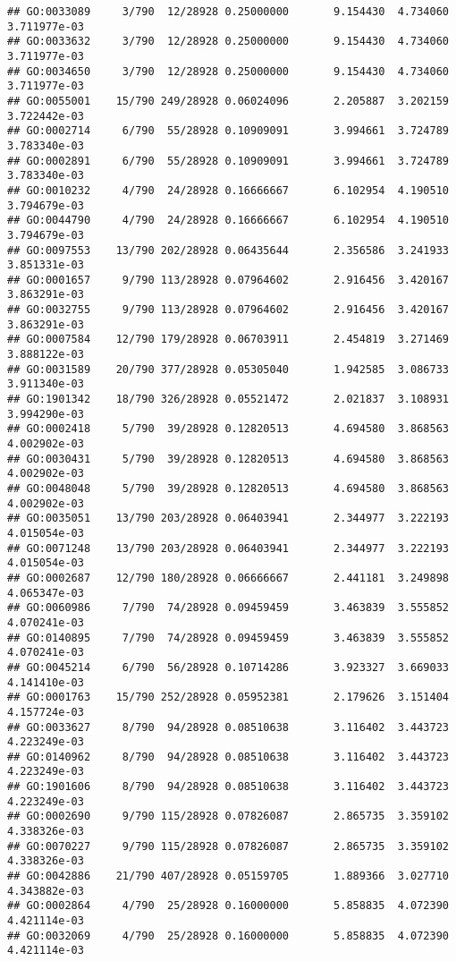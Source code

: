 \documentclass[
]{article}
\begin{document}
\begin{verbatim}
## GO:0033089     3/790  12/28928 0.25000000       9.154430  4.734060 3.711977e-03
## GO:0033632     3/790  12/28928 0.25000000       9.154430  4.734060 3.711977e-03
## GO:0034650     3/790  12/28928 0.25000000       9.154430  4.734060 3.711977e-03
## GO:0055001    15/790 249/28928 0.06024096       2.205887  3.202159 3.722442e-03
## GO:0002714     6/790  55/28928 0.10909091       3.994661  3.724789 3.783340e-03
## GO:0002891     6/790  55/28928 0.10909091       3.994661  3.724789 3.783340e-03
## GO:0010232     4/790  24/28928 0.16666667       6.102954  4.190510 3.794679e-03
## GO:0044790     4/790  24/28928 0.16666667       6.102954  4.190510 3.794679e-03
## GO:0097553    13/790 202/28928 0.06435644       2.356586  3.241933 3.851331e-03
## GO:0001657     9/790 113/28928 0.07964602       2.916456  3.420167 3.863291e-03
## GO:0032755     9/790 113/28928 0.07964602       2.916456  3.420167 3.863291e-03
## GO:0007584    12/790 179/28928 0.06703911       2.454819  3.271469 3.888122e-03
## GO:0031589    20/790 377/28928 0.05305040       1.942585  3.086733 3.911340e-03
## GO:1901342    18/790 326/28928 0.05521472       2.021837  3.108931 3.994290e-03
## GO:0002418     5/790  39/28928 0.12820513       4.694580  3.868563 4.002902e-03
## GO:0030431     5/790  39/28928 0.12820513       4.694580  3.868563 4.002902e-03
## GO:0048048     5/790  39/28928 0.12820513       4.694580  3.868563 4.002902e-03
## GO:0035051    13/790 203/28928 0.06403941       2.344977  3.222193 4.015054e-03
## GO:0071248    13/790 203/28928 0.06403941       2.344977  3.222193 4.015054e-03
## GO:0002687    12/790 180/28928 0.06666667       2.441181  3.249898 4.065347e-03
## GO:0060986     7/790  74/28928 0.09459459       3.463839  3.555852 4.070241e-03
## GO:0140895     7/790  74/28928 0.09459459       3.463839  3.555852 4.070241e-03
## GO:0045214     6/790  56/28928 0.10714286       3.923327  3.669033 4.141410e-03
## GO:0001763    15/790 252/28928 0.05952381       2.179626  3.151404 4.157724e-03
## GO:0033627     8/790  94/28928 0.08510638       3.116402  3.443723 4.223249e-03
## GO:0140962     8/790  94/28928 0.08510638       3.116402  3.443723 4.223249e-03
## GO:1901606     8/790  94/28928 0.08510638       3.116402  3.443723 4.223249e-03
## GO:0002690     9/790 115/28928 0.07826087       2.865735  3.359102 4.338326e-03
## GO:0070227     9/790 115/28928 0.07826087       2.865735  3.359102 4.338326e-03
## GO:0042886    21/790 407/28928 0.05159705       1.889366  3.027710 4.343882e-03
## GO:0002864     4/790  25/28928 0.16000000       5.858835  4.072390 4.421114e-03
## GO:0032069     4/790  25/28928 0.16000000       5.858835  4.072390 4.421114e-03

\end{verbatim}
\end{document}
